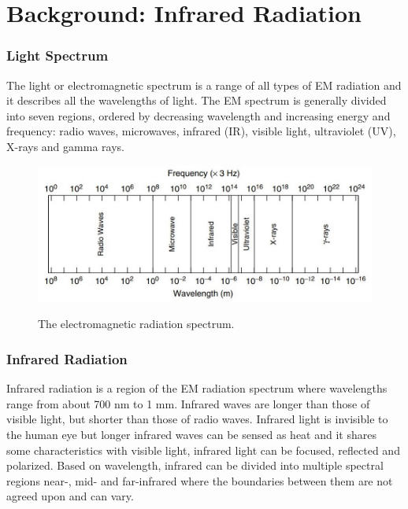 \section{Background: Infrared Radiation}
\subsubsection{Light Spectrum}
The light or electromagnetic spectrum is a range of all types of EM radiation and it describes all the wavelengths of light. 
The EM spectrum is generally divided into seven regions, ordered by decreasing wavelength and increasing energy and frequency: radio waves, microwaves, infrared (IR), visible light, ultraviolet (UV), X-rays and gamma rays. 


\begin{figure}[H]
\centering
\includegraphics[scale=0.5]{figures/electromagneticRadiation.JPG}
\caption{The electromagnetic radiation spectrum.}\label{fig:electromagneticRadiation}\parencite{electromagnetic}
\end{figure}



\subsubsection{Infrared Radiation}
Infrared radiation is a region of the EM radiation spectrum where wavelengths range from about 700 nm to 1 mm. Infrared waves are longer than those of visible light, but shorter than those of radio waves. 
Infrared light is invisible to the human eye but longer infrared waves can be sensed as heat and it shares some characteristics with visible light, infrared light can be focused, reflected and polarized.
Based on wavelength, infrared can be divided into multiple spectral regions near-, mid- and far-infrared where the boundaries between them are not agreed upon and can vary.
 




